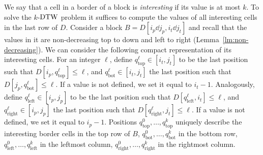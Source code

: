 We say that a cell in a border of a block is \emph{interesting} if its value is at most $k$. To solve the $k$-$\mathrm{DTW}$ problem it suffices to compute the values of all interesting cells in the last row of $D$. Consider a block $B = D[i_p\dd j_p, i_t \dd j_t]$ and recall that the values in it are non-decreasing top to down and left to right (Lemma~\ref{lm:non-decreasing}). We can consider the following compact representation of its interesting cells. For an integer $\ell$, define $q_{\text{top}}^\ell \in [i_t,j_t]$ to be the last position such that $D[i_p,q_{\text{top}}^\ell] \le \ell$, and $q_{\text{bot}}^\ell \in [i_t,j_t]$ the last position such that $D[j_p,q_{\text{bot}}^\ell] \le \ell$. If a value is not defined, we set it equal to $i_t-1$. Analogously, define $q_{\text{left}}^\ell \in [i_p,j_p]$ to be the last position such that $D[q_{\text{left}}^\ell,i_t] \le \ell$, and $q_{\text{right}}^\ell \in [i_p,j_p]$ the last position such that $D[q_{\text{right}}^\ell,j_t] \le \ell$. If a value is not defined, we set it equal to $i_p-1$.  Positions $q_{\text{top}}^0, \ldots, q_{\text{top}}^k$ uniquely describe the interesting border cells in the top row of $B$, $q_{\text{bot}}^0, \ldots, q_{\text{bot}}^k$ in the bottom row, $q_{\text{left}}^0, \ldots, q_{\text{left}}^k$ in the leftmost column,  $q_{\text{right}}^0, \ldots, q_{\text{right}}^k$ in the rightmost column. 


